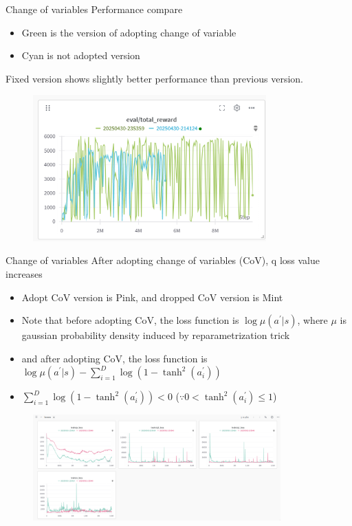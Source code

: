 \documentclass[8pt]{beamer}
\begin{document}
\begin{frame}{Change of variables}
    Performance compare
    \begin{itemize}
        \item Green is the version of adopting change of variable
        \item Cyan is not adopted version
    \end{itemize}
    Fixed version shows slightly better performance than previous version.
    \begin{figure}
        \centering
        \includegraphics[width=0.8\textwidth]{CovReturns.png}
    \end{figure}
\end{frame}

\begin{frame}{Change of variables}
    After adopting change of variables (CoV), q loss value increases

    \begin{itemize}
        \item Adopt CoV version is Pink, and dropped CoV version is Mint
        \item Note that before adopting CoV, the loss function is $\operatorname{log} \mu(a^\prime |s)$, where $\mu$ is gaussian probability density induced by reparametrization trick
        \item and after adopting CoV, the loss function is $\operatorname{log} \mu(a^\prime |s) - \sum_{i=1}^D \log{(1 - \operatorname{tanh}^2 (a^\prime_i))}$
        \item $ \sum_{i=1}^D \log{(1 - \operatorname{tanh}^2 (a^\prime_i))} < 0$ ($\because 0 < \operatorname{tanh}^2 (a^\prime_i) \leq 1$)
    
    \end{itemize}
    \begin{figure}
        \includegraphics[width=0.85\textwidth]{AfterCoVPLossDiff.png}
    \end{figure}
\end{frame}
\end{document}
